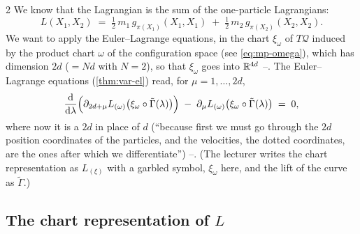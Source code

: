 \begin{paracol}{2}
We know that the Lagrangian is the sum of the one-particle Lagrangians:
\begin{equation}\label{eq:mp-Lfree}
  L(X_1,X_2)\;=\;\tfrac12\,m_1\,g_{\pi(X_1)}(X_1,X_1)\;+\;\tfrac12\,m_2\,g_{\pi(X_2)}(X_2,X_2).
\end{equation}
We want to apply the Euler--Lagrange equations, in the chart $\xi_\omega$ of $T\mathcal Q$ induced by the product chart $\omega$ of the configuration space (see \eqref{eq:mp-omega}), which has dimension $2d$ ($=Nd$ with $N=2$), so that $\xi_\omega$ goes into $\mathbb{R}^{4d}$ --. The Euler--Lagrange equations (\cref{thm:var-el}) read, for $\mu=1,\dots,2d$,
\begin{equation}\label{eq:mp-EL}
  \frac{\mathrm d}{\mathrm d\lambda}\Bigl(\partial_{2d+\mu}L_{(\omega)}\bigl(\xi_\omega\circ\tilde\Gamma(\lambda)\bigr)\Bigr)\;-\;\partial_\mu L_{(\omega)}\bigl(\xi_\omega\circ\tilde\Gamma(\lambda)\bigr)\;=\;0 ,
\end{equation}
where now it is a $2d$ in place of $d$ (``because first we must go through the $2d$ position coordinates of the particles, and the velocities, the dotted coordinates, are the ones after which we differentiate'') --. (The lecturer writes the chart representation as $L_{(\xi)}$ with a garbled symbol, $\xi_\omega$ here, and the lift of the curve as $\tilde\Gamma$.)

\subsection{The chart representation of $L$}\label{ssec:mp-chartrep}


\end{paracol}
